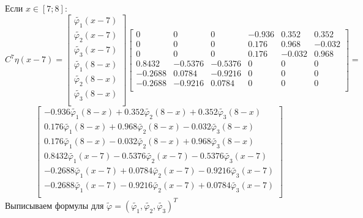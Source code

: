 \documentclass[a4paper, 12pt,fleqn]{extarticle}
\begin{document}
Если $x \in [7;8]$:
\[C^7\eta(x-7)=
\begin{bmatrix}
    \tilde{\varphi_1}(x-7)\\%
    \tilde{\varphi_2}(x-7)\\%
    \tilde{\varphi_3}(x-7)\\%
    \tilde{\varphi_1}(8-x)\\%
    \tilde{\varphi_2}(8-x)\\%
    \tilde{\varphi_3}(8-x)\\%
\end{bmatrix}
\begin{bmatrix}
0 & 0 & 0 & -0.936 & 0.352 & 0.352\\
0 & 0 & 0 & 0.176 & 0.968 & -0.032\\
0 & 0 & 0 & 0.176 & -0.032 & 0.968\\
0.8432 & -0.5376 & -0.5376 & 0 & 0 & 0\\
-0.2688 & 0.0784 & -0.9216 & 0 & 0 & 0\\
-0.2688 & -0.9216 & 0.0784 & 0 & 0 & 0\\
\end{bmatrix}=\]
\[
    \begin{bmatrix}
        -0.936 \tilde{\varphi_1}(8-x) + 0.352 \tilde{\varphi_2}(8-x) + 0.352 \tilde{\varphi_3}(8-x)\\
        0.176 \tilde{\varphi_1}(8-x) + 0.968 \tilde{\varphi_2}(8-x) - 0.032 \tilde{\varphi_3}(8-x)\\
        0.176 \tilde{\varphi_1}(8-x) - 0.032 \tilde{\varphi_2}(8-x) + 0.968 \tilde{\varphi_3}(8-x)\\
        0.8432 \tilde{\varphi_1}(x-7) - 0.5376 \tilde{\varphi_2}(x-7) - 0.5376 \tilde{\varphi_3}(x-7)\\
        -0.2688 \tilde{\varphi_1}(x-7) + 0.0784 \tilde{\varphi_2}(x-7) - 0.9216 \tilde{\varphi_3}(x-7)\\
        -0.2688 \tilde{\varphi_1}(x-7) - 0.9216 \tilde{\varphi_2}(x-7) + 0.0784 \tilde{\varphi_3}(x-7)\\
        \end{bmatrix}\]
Выписываем формулы для $\tilde{\varphi}=(\tilde{\varphi_1}, \tilde{\varphi_2}, \tilde{\varphi_3})^T$
\end{document}
